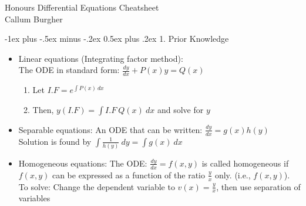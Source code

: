 \documentclass[10pt,landscape]{article}
\makeatletter
\renewcommand{\section}{\@startsection{section}{1}{0mm}%
                                {-1ex plus -.5ex minus -.2ex}%
                                {0.5ex plus .2ex}%
                                {\normalfont\large\bfseries}}
\makeatother
\begin{document}
\raggedright
\footnotesize
\begin{multicols}{2}

\setlength{\premulticols}{1pt}
\setlength{\postmulticols}{1pt}
\setlength{\multicolsep}{1pt}
\setlength{\columnsep}{2pt}
\setlength{\columnseprule}{0.4pt} %

\begin{center}
    \Large{Honours Differential Equations Cheatsheet}\\
    \footnotesize{Callum Burgher}\\ 
\end{center}
\normalsize

\section{1. Prior Knowledge}
\begin{itemize}
   
    \item Linear equations (Integrating factor method):\\The ODE in standard form: $\frac{dy}{dx}+P(x)y=Q(x)$
    \begin{enumerate}
        \item Let $I.F=e^{\int P(x)\ dx}$ 
        \item Then, $y(I.F)=\int I.F \ Q(x)\ dx$ and solve for $y$
    \end{enumerate}

\item Separable equations: An ODE that can be written: $\frac{dy}{dx}=g(x)h(y)$\\Solution is found by $\int \frac{1}{h(y)}\ dy = \int g(x)\ dx$

\item Homogeneous equations: The ODE: $\frac{dy}{dx}=f(x,y)$ is called homogeneous if $f(x,y)$ can be expressed as a function of the ratio $\frac{y}{x}$ only. (i.e., $f(x,y)$). \\ To solve: Change the dependent variable to $v(x)=\frac{y}{x}$, then use separation of variables


\end{itemize}
\end{multicols}
\end{document}
